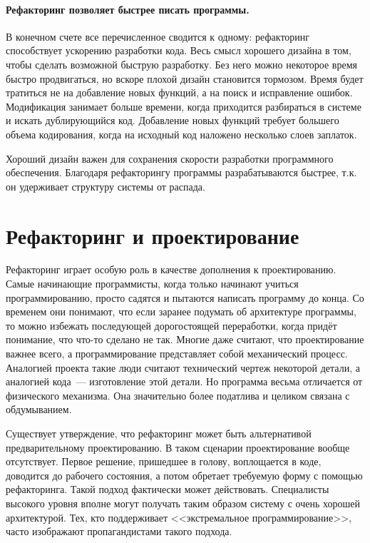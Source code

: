 \documentclass{../../text-style}
\begin{document}
\paragraph{Рефакторинг позволяет быстрее писать программы.} В конечном счете все перечисленное сводится к одному: рефакторинг способствует ускорению разработки кода. Весь смысл хорошего дизайна в том, чтобы сделать возможной быструю разработку. Без него можно некоторое время быстро продвигаться, но вскоре плохой дизайн становится тормозом. Время будет тратиться не на добавление новых функций, а на поиск и исправление ошибок. Модификация занимает больше времени, когда приходится разбираться в системе и искать дублирующийся код. Добавление новых функций требует большего объема кодирования, когда на исходный код наложено несколько слоев заплаток.

Хороший дизайн важен для сохранения скорости разработки программного обеспечения. Благодаря рефакторингу программы разрабатываются быстрее, т.к. он удерживает структуру системы от распада.

\section{Рефакторинг и проектирование}

Рефакторинг играет особую роль в качестве дополнения к проектированию. Самые начинающие программисты, когда только начинают учиться программированию, просто садятся и пытаются написать программу до конца. Со временем они понимают, что если заранее подумать об архитектуре программы, то можно избежать последующей дорогостоящей переработки, когда придёт понимание, что что-то сделано не так. Многие даже считают, что проектирование важнее всего, а программирование представляет собой механический процесс. Аналогией проекта такие люди считают технический чертеж некоторой детали, а аналогией кода~--- изготовление этой детали. Но программа весьма отличается от физического механизма. Она значительно более податлива и целиком связана с обдумыванием.

Существует утверждение, что рефакторинг может быть альтернативой предварительному проектированию. В таком сценарии проектирование вообще отсутствует. Первое решение, пришедшее в голову, воплощается в коде, доводится до рабочего состояния, а потом обретает требуемую форму с помощью рефакторинга. Такой подход фактически может действовать. Специалисты высокого уровня вполне могут получать таким образом систему с очень хорошей архитектурой. Тех, кто поддерживает <<экстремальное программирование>>, часто изображают пропагандистами такого подхода.
\end{document}
